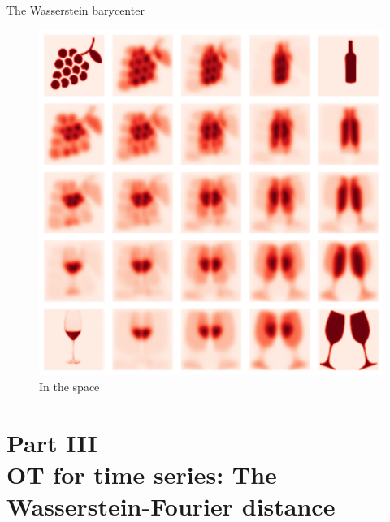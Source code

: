 \documentclass[pdf,aspectratio=169,10pt]{beamer}
\begin{document}
\begin{frame}{The Wasserstein barycenter}
\begin{minipage}{0.48\textwidth}
    \end{minipage}
    \hfill
    \begin{minipage}{0.48\textwidth}
\begin{figure}
            \centering
                \includegraphics[clip, height=0.7\textheight]{../img/symboles_wine_bary.pdf}
            \caption{In the  space}
            \end{figure}
            
        \end{minipage}
\end{frame}

\section{Part III\\ OT for time series: The Wasserstein-Fourier distance}



\begin{frame}
    \Large {}
\end{frame}
\end{document}
